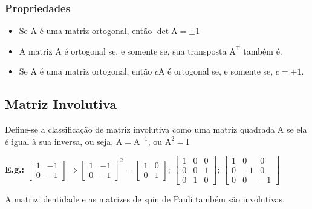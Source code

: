 \documentclass[a4paper,12pt]{article}
\begin{document}
\subsubsection{Propriedades}

\begin{itemize}

    \item Se $ \text{A} $ é uma matriz ortogonal, então $ \det \text{A} = \pm 1 $
    
    \item A matriz $ \text{A} $ é ortogonal se, e somente se, sua transposta $ \text{A}^{\text{T}} $ também é.
    
    \item Se $ \text{A} $ é uma matriz ortogonal, então $ c \text{A} $ é ortogonal se, e somente se, $ c = \pm 1 $.
    
    
\end{itemize}

\subsection{Matriz Involutiva}

Define-se a classificação de matriz involutiva como uma matriz quadrada $ \text{A} $ se ela é igual à sua inversa, ou seja, $ \text{A} = \text{A}^{-1} $, ou $ \text{A}^{2} = \text{I} $

\textbf{E.g.:} $ \begin{bmatrix}
1 & -1 \\
0 & -1
\end{bmatrix} \Rightarrow \begin{bmatrix}
1 & -1 \\
0 & -1
\end{bmatrix}^{2} = \begin{bmatrix}
1 & 0 \\
0 & 1 
\end{bmatrix}$; $ \begin{bmatrix}
1 & 0 & 0\\
0 & 0 & 1\\
0 & 1 & 0
\end{bmatrix} $; $ \begin{bmatrix}
1 & 0 & 0\\
0 & -1 & 0\\
0 & 0 & -1
\end{bmatrix} $

A matriz identidade e as matrizes de spin de Pauli também são involutivas.
\end{document}
